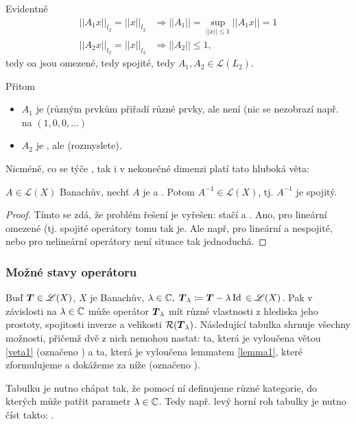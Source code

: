 Evidentně
\begin{equation*}
\begin{split}
  ||A_1x||_{l_2}=||x||_{l_2}&\Rightarrow ||A_1||=\sup\limits_{||x||\leq1}||A_1 x||=1\\
  ||A_2x||_{l_2}=||x||_{l_2}&\Rightarrow ||A_2||\leq1,
\end{split}
\end{equation*}
tedy oa jsou omezené, tedy spojité, tedy $A_1,A_2\in \mathscr{L}(L_2)$.

Přitom \begin{itemize}
    \item $A_1$ je  (různým prvkům přiřadí různé prvky, ale není  (nic se nezobrazí např. na $(1,0,0,\dots)$
    \item $A_2$ je , ale  (rozmyslete).
\end{itemize}

Nicméně, co se týče , tak i v nekonečné dimenzi platí tato hluboká věta:
\begin{theorem}
$A\in \mathscr{L}(X)$ Banachův, nechť $A$ je  a . Potom $A^{-1}\in \mathscr{L}(X)$, tj. $A^{-1}$ je spojitý.
\end{theorem}

\begin{proof}
    Tímto se zdá, že problém  řešení je vyřešen: stačí  a . Ano, pro lineární omezené (tj. spojité operátory tomu tak je. Ale např, pro lineární a nespojité, nebo pro nelineární operátory není situace tak jednoduchá.
\end{proof}

\subsubsection{Možné stavy operátoru}
Buď $ \boldsymbol{T} \in\mathscr{L}(X)$, $X$ je Banachův, $\lambda\in\mathbb{C},\;  \boldsymbol{T} _\lambda\coloneqq  \boldsymbol{T} -\lambda\operatorname{Id}\, \in\mathscr{L}(X)$. Pak v závislosti na $\lambda\in\mathbb{C}$ může operátor $ \boldsymbol{T} _\lambda$ mít různé vlastnosti z hlediska jeho prostoty, spojitosti inverze a velikosti $\mathcal{R}( \boldsymbol{T} _\lambda)$. Následující tabulka shrnuje všechny možnosti, přičemž dvě z nich nemohou nastat: ta, která je vyloučena větou \ref{veta1} (označeno ) a ta, která je vyloučena lemmatem \ref{lemma1}, které zformulujeme a dokážeme za níže (označeno ).

Tabulku je nutno chápat tak, že pomocí ní definujeme různé kategorie, do kterých může patřit parametr $\lambda\in\mathbb{C}$. Tedy např. levý horní roh tabulky je nutno číst takto: .

